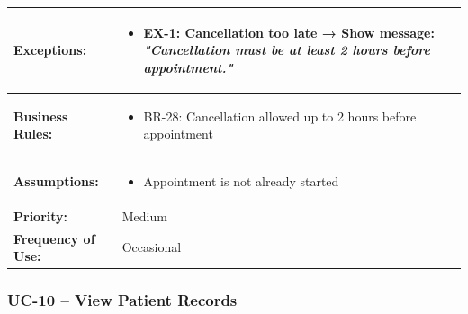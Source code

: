 \documentclass[12pt,a4paper]{article}
\begin{document}
\begin{longtable}{|p{4.5cm}|p{10.5cm}|}
\hline
\textbf{Exceptions:} &
\begin{itemize}
  \item EX-1: Cancellation too late → Show message: \textit{"Cancellation must be at least 2 hours before appointment."}
\end{itemize} \\
\hline
\textbf{Business Rules:} &
\begin{itemize}
  \item BR-28: Cancellation allowed up to 2 hours before appointment
\end{itemize} \\
\hline
\textbf{Assumptions:} &
\begin{itemize}
  \item Appointment is not already started
\end{itemize} \\
\hline
\textbf{Priority:} & Medium \\
\hline
\textbf{Frequency of Use:} & Occasional \\
\hline
\end{longtable}

\subsubsection{UC-10 – View Patient Records}
\end{document}
